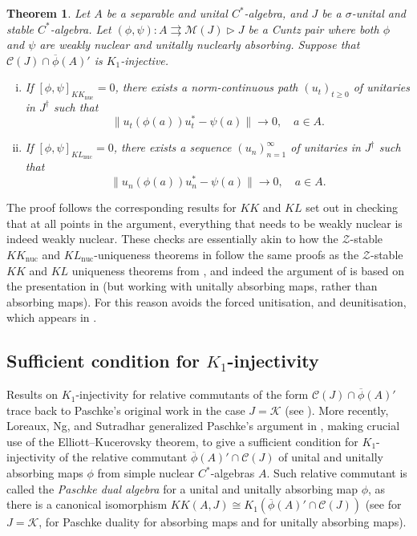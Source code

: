 \documentclass[reqno]{amsart}
\newtheorem{thm}{Theorem}[section]
\theoremstyle{definition}
\theoremstyle{remark}
\numberwithin{equation}{section}
\theoremstyle{definition}
\newcommand{\calC}{\mathcal{C}}
\newcommand{\calM}{\mathcal{M}}
\newcommand{\calK}{\mathcal{K}}
\begin{document}
\begin{thm} 
\label{KK_KL_uniqueness} 
Let $A$ be a separable and unital $C^*$-algebra, and $J$ be a $\sigma$-unital and stable $C^*$-algebra. Let $(\phi, \psi) \colon A\rightrightarrows \calM(J)\rhd J$ be a Cuntz pair where both $\phi$ and $\psi$ are weakly nuclear and unitally nuclearly absorbing. Suppose that $\calC(J) \cap \overline{\phi} (A)'$ is $K_{1}$-injective. 
\begin{enumerate} [(i)]
\item If $[\phi, \psi]_{KK_{\mathrm{nuc}}} = 0$, there exists a norm-continuous path $(u_{t})_{t\geq 0}$ of unitaries in $J^\dagger$ such that 
\begin{equation} 
\|u_t(\phi(a))u_t^*-\psi(a)\|\to 0,\quad a\in A. 
\end{equation} 
\item If $[\phi, \psi]_{KL_{\mathrm{nuc}}} = 0$, there exists a sequence $(u_{n})_{n=1}^{\infty}$ of unitaries in $J^\dagger$ such that 
\begin{equation} 
\|u_n(\phi(a))u_n^*-\psi(a)\|\to 0,\quad a\in A. 
\end{equation} 
\end{enumerate} 
\end{thm} 

The proof follows the corresponding results for $KK$ and $KL$ set out in \cite[Theorem 4.3.5]{Hua_thesis} checking that at all points in the argument, everything that needs to be weakly nuclear is indeed weakly nuclear. These checks are essentially akin to how the $\mathcal Z$-stable $KK_{\mathrm{nuc}}$ and $KL_{\mathrm{nuc}}$-uniqueness theorems in \cite[Section 5.5]{CGSTW} follow the same proofs as the $\mathcal Z$-stable $KK$ and $KL$ uniqueness theorems from \cite[Section 5.4]{CGSTW}, and indeed the argument of \cite[Theorem 4.3.5]{Hua_thesis} is based on the presentation in \cite[Section 5.4]{CGSTW} (but working with unitally absorbing maps, rather than absorbing maps). For this reason \cite{Hua_thesis} avoids the forced unitisation, and deunitisation, which appears in \cite[Section 5.4]{CGSTW}. 

\subsection{Sufficient condition for $K_{1}$-injectivity}  Results on $K_{1}$-injectivity for relative commutants of the form $\calC(J) \cap \overline{\phi}(A)'$ trace back to Paschke’s original work in the case $J = \calK$ (see \cite[Lemma 3]{Paschke}). More recently, Loreaux, Ng, and Sutradhar generalized Paschke’s argument in \cite[Theorem 2.15]{K1-injective}, making crucial use of the Elliott--Kucerovsky theorem, to give a sufficient condition for $K_{1}$-injectivity of the relative commutant $\overline{\phi}(A)'\cap\mathcal C(J)$ of unital and unitally absorbing maps $\phi$ from simple nuclear $C^*$-algebras $A$. Such relative commutant is called the \emph{Paschke dual algebra} for a unital and unitally absorbing map $\phi$, as there is a canonical isomorphism $KK(A, J) \cong K_{1}(\overline{\phi}(A)'\cap\mathcal C(J))$ (see \cite{Paschke} for $J = \calK$, \cite{Thomsen} for Paschke duality for absorbing maps and \cite[Proposition 2.5]{K1-injective} for unitally absorbing maps).  
\end{document}
